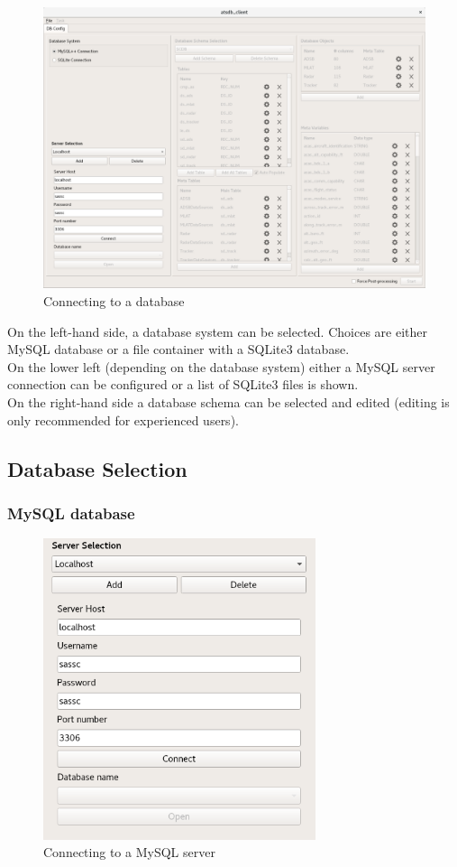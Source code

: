 \documentclass[10pt,letterpaper,extrafontsizes]{memoir}
\begin{document}
\begin{figure}[H]
  \hspace*{-2cm}
    \includegraphics[width=18cm]{../screenshots/db_config_connect.png}
  \caption{Connecting to a database}
  \label{fig:db_connect}
\end{figure}

On the left-hand side, a database system can be selected.  Choices are either MySQL database or a file container with a SQLite3 database. \\
On the lower left (depending on the database system) either a MySQL server connection can be configured or a list of SQLite3 files is shown.\\

On the right-hand side a database schema can be selected and edited (editing is only recommended for experienced users).

\subsection{Database Selection}
\subsubsection{MySQL database}

\begin{figure}[H]
  \center
    \includegraphics[width=8cm]{../screenshots/mysql_server_selection.png}
  \caption{Connecting to a MySQL server}
  \label{fig:mysql_connect}
\end{figure}
\end{document}
